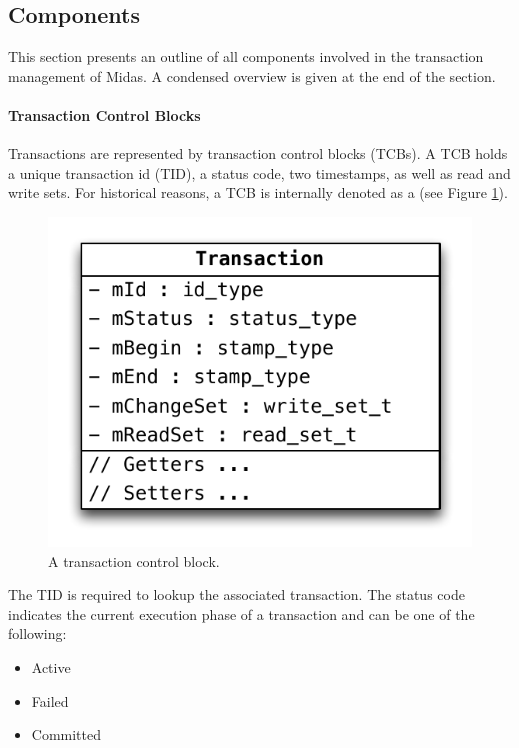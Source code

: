 \newpage

\subsection{Components}
\label{ch:impl-components}

This section presents an outline of all components involved in the transaction management of Midas. A condensed overview is given at the end of the section.

\paragraph{Transaction Control Blocks}

Transactions are represented by transaction control blocks (TCBs). A TCB holds a unique transaction id (TID), a status code, two timestamps, as well as read and write sets. For historical reasons, a TCB is internally denoted as a  (see Figure \ref{fig:tcb}).

\begin{figure}[h!]
    \centering
    \includegraphics[scale=.75]{figures/impl/tx.pdf}
    \caption{A transaction control block.}
    \label{fig:tcb}
\end{figure}

The TID is required to lookup the associated transaction. The status code indicates the current execution phase of a transaction and can be one of the following:

\begin{itemize}
    \item Active
    \item Failed
    \item Committed
\end{itemize}

